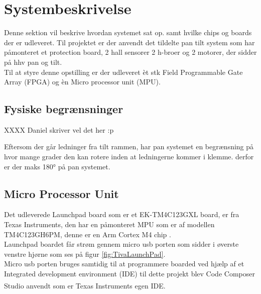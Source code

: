 \section{Systembeskrivelse}
Denne sektion vil beskrive hvordan systemet sat op. samt hvilke chips og boards der er udleveret.
Til projektet er der anvendt det tildelte pan tilt system som har påmonteret et protection board, 2 hall sensorer 2 h-broer og 2 motorer, der sidder på hhv pan og tilt.\\
Til at styre denne opstilling er der udleveret èt stk Field Programmable Gate Array (FPGA) og èn Micro processor unit (MPU).
\\

\subsection{Fysiske begrænsninger}
XXXX Daniel skriver vel det her :p

Eftersom der går ledninger fra tilt rammen, har pan systemet en begrænsning på hvor mange grader den kan rotere inden at ledningerne kommer i klemme. derfor er der maks 180° på pan systemet.

\subsection{Micro Processor Unit}
Det udleverede Launchpad board som er et EK-TM4C123GXL board, er fra Texas Instruments, den har en påmonteret MPU som er af modellen TM4C123GH6PM, denne er en Arm Cortex M4 chip \cite{TM4C123GH6PMDatasheet}.\\
Launchpad boardet får strøm gennem micro usb porten som sidder i øverste venstre hjørne som ses på figur \ref{fig:TivaLaunchPad}.\\
Micro usb porten bruges samtidig til at programmere boarded ved hjælp af et Integrated development environment (IDE) til dette projekt blev Code Composer Studio \textsuperscript{\texttrademark} anvendt som er Texas Instruments egen IDE.


